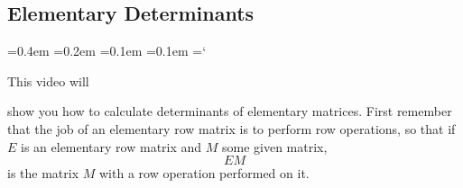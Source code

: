 
\subsection*{Elementary Determinants}

{\ttfamily
{}\font=0.4em
\font=0.2em
\font=0.1em
\font=0.1em
\hyphenchar\font=`\-


\hypertarget{scripts_elementary_matrices_determinants_ii_dets}{This video will}
show you how to calculate determinants of elementary matrices.
First remember that the job of an elementary row matrix is to perform row operations, 
so that if $E$ is an elementary row matrix and $M$ some given matrix,
\[EM\]
is the matrix $M$ with a row operation performed on it. 

}
